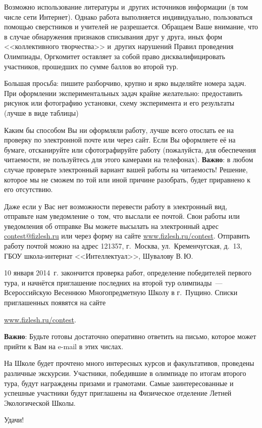 \documentclass[a4paper,12pt]{article}
\begin{document}
\bigskip


Возможно использование литературы и~других источников информации (в том числе сети Интернет).
Однако работа выполняется индивидуально, пользоваться помощью сверстников и учителей не разрешается.
Обращаем Ваше внимание, что в случае обнаружения признаков списывания друг у друга,
иных форм <<коллективного творчества>> и~других нарушений Правил проведения Олимпиады,
Оргкомитет оставляет за собой право дисквалифицировать участников, прошедших по сумме баллов во второй тур.


\bigskip


Большая просьба: пишите разборчиво, крупно и ярко выделяйте номера задач.
При оформлении экспериментальных задач крайне желательно: предоставить рисунок или фотографию
установки, схему эксперимента и его результаты (лучше в виде таблицы)

Каким бы способом Вы ни оформляли работу, лучше всего отослать ее на проверку по электронной
почте или через сайт. Если Вы оформляете её на бумаге, отсканируйте или сфотографируйте работу
(пожалуйста, для обеспечения читаемости, не пользуйтесь для этого камерами на телефонах).
\textbf{Важно}: в любом случае проверьте электронный вариант вашей работы на читаемость!
Решение, которое мы не сможем по той или иной причине разобрать, будет приравнено к его отсутствию.

Даже если у Вас нет возможности перевести работу в электронный вид, отправьте нам уведомление
о~том, что выслали ее почтой. Свои работы или уведомления об отправке Вы можете высылать
на электронный адрес \href{mailto:contest@fizlesh.ru}{contest@fizlesh.ru}
или через форму на сайте \href{http://fizlesh.ru/contest}{www.fizlesh.ru/contest}.
Отправить работу почтой можно на адрес 121357, г.~Москва, ул.~Кременчугская, д.~13, ГБОУ школа-интернат
<<Интеллектуал>>, Шувалову В.\,Ю.


\bigskip


10 января 2014~г. закончится проверка работ, определение победителей первого тура, и начнётся
приглашение последних на второй тур олимпиады~--- Всероссийскую Весеннюю Многопредметную Школу
в г.~Пущино. Списки приглашенных появятся на сайте\\
\centerline{\href{http://fizlesh.ru/contest}{www.fizlesh.ru/contest}.}
\textbf{Важно}: Будьте готовы достаточно оперативно ответить на письмо, которое может
прийти к Вам на e-mail в этих числах.

\bigskip

На Школе будет прочтено много интересных курсов и факультативов, проведены различные экскурсии.
Участники, победившие в олимпиаде по итогам второго тура, будут награждены призами и грамотами.
Самые заинтересованные и успешные участники будут приглашены на Физическое отделение Летней Экологической Школы.

\bigskip

Удачи!
\end{document}
